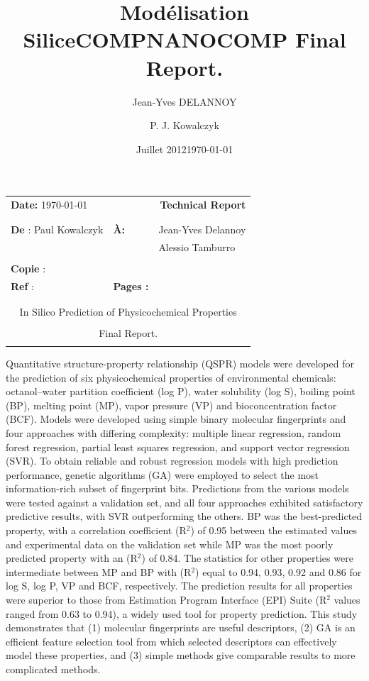\documentclass[10pt, letter]{report}
\title{Modélisation Silice}
\date{Juillet 2012}
\author{Jean-Yves DELANNOY}
\renewcommand{\=}{\, =\, }
\newcommand{\+}{\, +\, }
\renewcommand{\-}{\, -\, }
\begin{document}
\title{\textbf{COMPNANOCOMP Final Report.}}


\author{P. J. Kowalczyk}
\date{\today}

\vspace*{1cm}
\hspace*{-1cm}\begin{tabular}{p{}p{}p{}}
{\bf Date:} \today & \multicolumn{2}{r}{{\huge \bf{Technical Report }}}\\
\\
\hline
\\
{\bf De} : Paul Kowalczyk  & \bf{\`A:} & Jean-Yves Delannoy \\
&& Alessio Tamburro \\

 \\
{\bf Copie} :   \\
{\bf Ref} :&  {\bf Pages : }  & \pageref{LastPage} \\
\\
\hline
\\
\multicolumn{3}{c}{\LARGE In Silico Prediction of Physicochemical Properties} \\
\\
\multicolumn{3}{c}{\LARGE Final Report.} \\
\\
\hline
\end{tabular}
%
\vspace*{2cm}

Quantitative structure-property relationship (QSPR) models were developed for the
prediction of six physicochemical properties of environmental chemicals: octanol–water
partition coefficient (log P), water solubility (log S), boiling point (BP), melting point (MP),
vapor pressure (VP) and bioconcentration factor (BCF). Models were developed using
simple binary molecular fingerprints and four approaches with differing complexity: multiple
linear regression, random forest regression, partial least squares regression, and support
vector regression (SVR). To obtain reliable and robust regression models with high
prediction performance, genetic algorithms (GA) were employed to select the most
information-rich subset of fingerprint bits. Predictions from the various models were tested
against a validation set, and all four approaches exhibited satisfactory predictive results, with
SVR outperforming the others. BP was the best-predicted property, with a correlation
coefficient (R\(^{2}\)) of 0.95 between the estimated values and experimental data on the
validation set while MP was the most poorly predicted property with an (R\(^{2}\)) of 0.84. The
statistics for other properties were intermediate between MP and BP with (R\(^{2}\)) equal to 0.94,
0.93, 0.92 and 0.86 for log S, log P, VP and BCF, respectively. The prediction results for all
properties were superior to those from Estimation Program Interface (EPI) Suite (R\(^{2}\) values
ranged from 0.63 to 0.94), a widely used tool for property prediction. This study
demonstrates that (1) molecular fingerprints are useful descriptors, (2) GA is an efficient
feature selection tool from which selected descriptors can effectively model these properties,
and (3) simple methods give comparable results to more complicated methods. 
\end{document}
